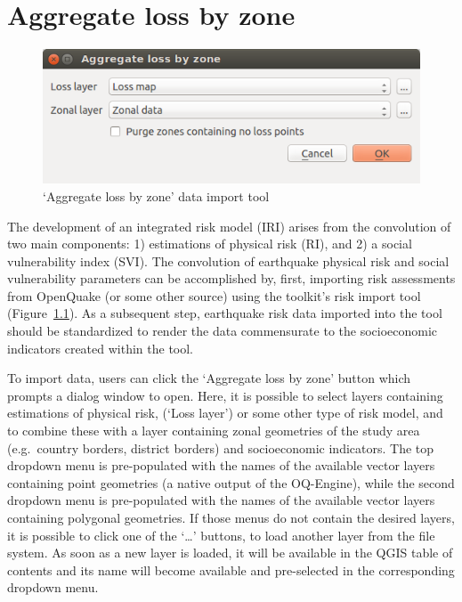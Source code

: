 \chapter{Aggregate loss by zone}

\begin{figure}
    \centering
    \includegraphics[width=\textwidth]{../images/image08}
    \caption{`Aggregate loss by zone' data import tool}
    \label{fig:aggregate_loss_by_zone}
\end{figure}

The development of an integrated risk model (IRI) arises from the convolution
of two main components: 1) estimations of physical risk (RI), and 2) a social
vulnerability index (SVI). The convolution of earthquake physical risk and
social vulnerability parameters can be accomplished by, first, importing risk
assessments from OpenQuake (or some other source) using the toolkit's risk
import tool (Figure~\ref{fig:aggregate_loss_by_zone}). As a subsequent step,
earthquake risk data imported into the tool should be standardized to render
the data commensurate to the socioeconomic indicators created within the tool.

To import data, users can click the `Aggregate loss by zone' button which
prompts a dialog window to open. Here, it is possible to select layers
containing estimations of physical risk, (`Loss layer') or some other type of
risk model, and to combine these with a layer containing zonal geometries of
the study area (e.g.\ country borders, district borders) and socioeconomic
indicators. The top dropdown menu is pre-populated with the names of the
available vector layers containing point geometries (a native output of the
OQ-Engine), while the second dropdown menu is pre-populated with the names of
the available vector layers containing polygonal geometries. If those menus do
not contain the desired layers, it is possible to click one of the `\dots'
buttons, to load another layer from the file system. As soon as a new layer is
loaded, it will be available in the QGIS table of contents and its name will
become available and pre-selected in the corresponding dropdown menu.

